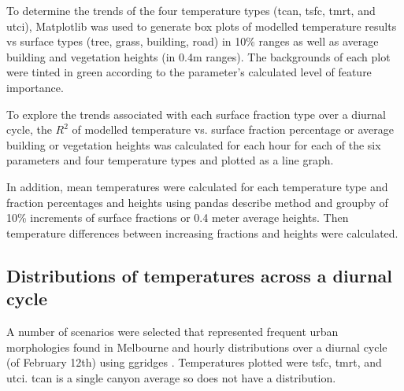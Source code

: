 \documentclass[final,3p,times,authoryear]{elsarticle}
\begin{document}
% 

To determine the trends of the four temperature types (\gls{tcan}, \gls{tsfc}, \gls{tmrt}, and \gls{utci}), Matplotlib \citep{Hunter2007} was used to generate box plots of modelled temperature results vs surface types (tree, grass, building, road) in 10\% ranges as well as average building and vegetation heights (in 0.4m ranges). The backgrounds of each plot were tinted in green according to the parameter's calculated level of feature importance.

To explore the trends associated with each surface fraction type over a diurnal cycle, the $R^{2}$ of modelled temperature vs. surface fraction percentage or average building or vegetation heights was calculated for each hour for each of the six parameters and four temperature types and plotted as a line graph. 

In addition, mean temperatures were calculated for each temperature type and fraction percentages and heights using pandas \citep{reback2020pandas} describe method and groupby of 10\% increments of surface fractions or 0.4 meter average heights. Then temperature differences between increasing fractions and heights were calculated.



\subsection{Distributions of temperatures across a diurnal cycle}\label{sec:methodsdist}
%
% 

A number of scenarios were selected that represented frequent urban morphologies found in Melbourne and hourly distributions over a diurnal cycle (of February 12th) using ggridges \citep{ggridges}. Temperatures plotted were \gls{tsfc}, \gls{tmrt}, and \gls{utci}. \gls{tcan} is a single canyon average so does not have a distribution.
\end{document}
